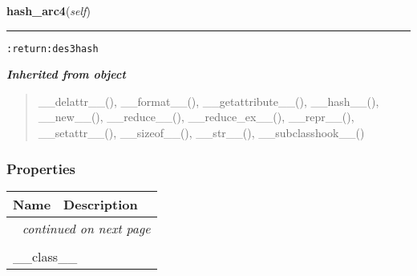 \hspace{.8\funcindent}\begin{boxedminipage}{\funcwidth}

    \raggedright \textbf{hash\_arc4}(\textit{self})

    \vspace{-1.5ex}

    \rule{\textwidth}{0.5\fboxrule}
\setlength{\parskip}{2ex}
\begin{alltt}

:return: des3 hash
\end{alltt}

\setlength{\parskip}{1ex}
    \end{boxedminipage}


\large{\textbf{\textit{Inherited from object}}}

\begin{quote}
\_\_delattr\_\_(), \_\_format\_\_(), \_\_getattribute\_\_(), \_\_hash\_\_(), \_\_new\_\_(), \_\_reduce\_\_(), \_\_reduce\_ex\_\_(), \_\_repr\_\_(), \_\_setattr\_\_(), \_\_sizeof\_\_(), \_\_str\_\_(), \_\_subclasshook\_\_()
\end{quote}


  \subsubsection{Properties}

    \vspace{-1cm}
\hspace{\varindent}\begin{longtable}{|p{\varnamewidth}|p{\vardescrwidth}|l}
\cline{1-2}
\cline{1-2} \centering \textbf{Name} & \centering \textbf{Description}& \\
\cline{1-2}
\endhead\cline{1-2}\multicolumn{3}{r}{\small\textit{continued on next page}}\\\endfoot\cline{1-2}
\endlastfoot\multicolumn{2}{|l|}{\textit{Inherited from object}}\\
\multicolumn{2}{|p{\varwidth}|}{\raggedright \_\_class\_\_}\\
\cline{1-2}
\end{longtable}



